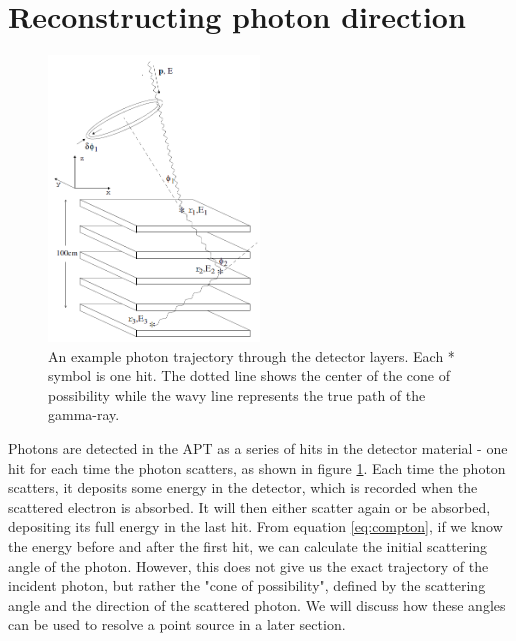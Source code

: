 
\section{Reconstructing photon direction}

\begin{figure}
    \centering
    \includegraphics[width=0.5\textwidth]{detector_scattering.PNG}
    \caption{An example photon trajectory through the detector layers. Each * symbol is one hit. The dotted line shows the center of the cone of possibility while the wavy line represents the true path of the gamma-ray. \cite{comptonThesis}}
    \label{fig:scatters}
\end{figure}

Photons are detected in the APT as a series of hits in the detector material - one hit for each time the photon scatters, as shown in figure \ref{fig:scatters}. Each time the photon scatters, it deposits some energy in the detector, which is recorded when the scattered electron is absorbed. It will then either scatter again or be absorbed, depositing its full energy in the last hit. From equation \ref{eq:compton}, if we know the energy before and after the first hit, we can calculate the initial scattering angle of the photon. However, this does not give us the exact trajectory of the incident photon, but rather the "cone of possibility", defined by the scattering angle and the direction of the scattered photon. We will discuss how these angles can be used to resolve a point source in a later section.

